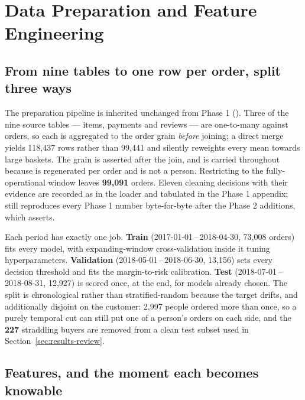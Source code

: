 \section{Data Preparation and Feature Engineering}
\label{sec:data}

\subsection{From nine tables to one row per order, split three ways}

The preparation pipeline is inherited unchanged from Phase 1
(). Three of the nine source tables --- items, payments
and reviews --- are one-to-many against orders, so each is aggregated to the
order grain \emph{before} joining; a direct merge yields 118{,}437 rows rather
than 99{,}441 and silently reweights every mean towards large baskets. The grain
is asserted after the join, and  is carried throughout
because  is regenerated per order and is not a person.
Restricting to the fully-operational window leaves \textbf{99{,}091} orders.
Eleven cleaning decisions with their evidence are recorded as
 in the loader and tabulated in the Phase 1 appendix;
 still reproduces every Phase 1 number byte-for-byte
after the Phase 2 additions, which  asserts.

Each period has exactly one job. \textbf{Train} (2017-01-01\,--\,2018-04-30,
73{,}008 orders) fits every model, with expanding-window cross-validation inside
it tuning hyperparameters. \textbf{Validation} (2018-05-01\,--\,2018-06-30,
13{,}156) sets every decision threshold and fits the margin-to-risk calibration.
\textbf{Test} (2018-07-01\,--\,2018-08-31, 12{,}927) is scored once, at the end,
for models already chosen. The split is chronological rather than
stratified-random because the target drifts, and additionally disjoint on the
customer: 2{,}997 people ordered more than once, so a purely temporal cut can
still put one of a person's orders on each side, and the \textbf{227} straddling
buyers are removed from a clean test subset used in
Section~\ref{sec:results-review}.

\subsection{Features, and the moment each becomes knowable}

